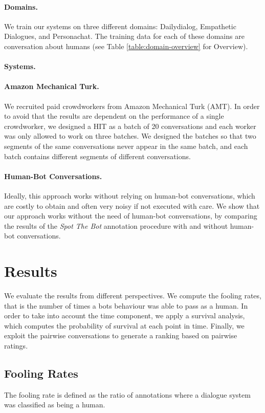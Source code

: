 \documentclass[11pt,a4paper]{article}
\begin{document}
\paragraph{Domains.} We train our systems on three different domains:  Dailydialog, Empathetic Dialogues, and Personachat. The training data for each of these domains are conversation about humans (see Table \ref{table:domain-overview} for Overview). 

\paragraph{Systems.}  

\paragraph{Amazon Mechanical Turk.} We recruited paid crowdworkers from Amazon Mechanical Turk (AMT). In order to avoid that the results are dependent on the performance of a single crowdworker, we designed a HIT as a batch of 20 conversations and each worker was only allowed to work on three batches. We designed the batches so that two segments of the same conversations never appear in the same batch, and each batch contains different segments of different conversations.  

\paragraph{Human-Bot Conversations.} Ideally, this approach works without relying on human-bot conversations, which are costly to obtain and often very noisy if not executed with care. We show that our approach works without the need of human-bot conversations, by comparing the results of the \emph{Spot The Bot}  annotation procedure with and without human-bot conversations. 


\section{Results}

We evaluate the results from different perspectives. We compute the fooling rates, that is the number of times a bots behaviour was able to pass as a human. In order to take into account the time component, we apply a survival analysis, which computes the probability of survival at each point in time. Finally, we exploit the pairwise conversations to generate a ranking based on pairwise ratings. 

\subsection{Fooling Rates}
The fooling rate is defined as the ratio of annotations where a dialogue system was classified as being a human. 
\end{document}
